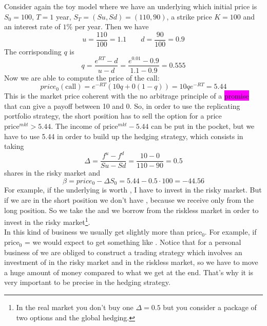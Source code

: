 \begin{example}{}{}
Consider again the toy model where we have an underlying which initial price is $S_0=100$, $T=1$ year, $S_T=(Su,Sd)=(110,90)$, a strike price $K=100$ and an interest rate of $1\%$ per year. Then we have 
\begin{equation*}
    u = \dfrac{110}{100} = 1.1 \qquad d = \dfrac{90}{100} = 0.9
\end{equation*}
The corrisponding $q$ is 
\begin{equation*}
    q = \dfrac{e^{RT}-d}{u-d} = \dfrac{e^{0.01}-0.9}{1.1-0.9} = 0.555
\end{equation*}
Now we are able to compute the price of the call:
\begin{equation}
    price_0(\mbox{call}) = e^{-RT}(10q+ 0(1-q)) = 10qe^{-RT} = 5.44
\end{equation}
This is the market price coherent with the no arbitrage principle of a \colorbox{magenta}{promise} that can give a payoff between 10 and 0. So, in order to use the replicating portfolio strategy, the short position has to sell the option for a price $\mbox{price}^{mkt}>5.44$. The income of $\mbox{price}^{mkt}-5.44$ can be put in the pocket, but we have to use 5.44 in order to build up the hedging strategy, which consists in taking
\begin{equation*}
    \Delta = \dfrac{f^u-f^d}{Su-Sd} = \dfrac{10-0}{110-90} = 0.5
\end{equation*}
shares in the risky market and 
\begin{equation*}
    \beta = price_0-\Delta S_0 = 5.44 - 0.5\cdot100 = -44.56
\end{equation*}
For example, if the underlying is worth , I have to invest  in the risky market. But if we are in the short position we don't have , because we receive only  from the long position. So we take the  and we borrow  from the riskless market in order to invest in the risky market\footnote{In the real market you don't buy one $\Delta = 0.5$ but you consider a package of two options and the global hedging.}. \\
In this kind of business we usually get slightly more than price$_0$. For example, if price$_0$ =  we would expect to get something like . Notice that for a personal business of  we are obliged to construct a trading strategy which involves an investment of  in the risky market and  in the riskless market, so we have to move a huge amount of money compared to what we get at the end. That's why it is very important to be precise in the hedging strategy.
\end{example}

